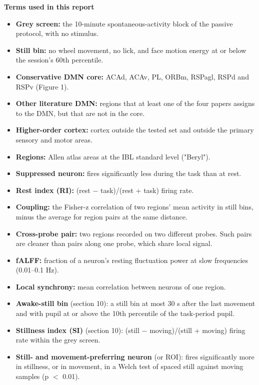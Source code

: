 \documentclass[10pt,a4paper]{article}
\begin{document}
\begin{tcolorbox}[breakable,colback=accent!8,colframe=accent,boxrule=0pt,leftrule=2pt,arc=0pt,fontupper=\small]
\textbf{Terms used in this report}

\begin{itemize}
\item \textbf{Grey screen:} the 10-minute spontaneous-activity block of the passive protocol, with no stimulus.
\item \textbf{Still bin:} no wheel movement, no lick, and face motion energy at or below the session's 60th percentile.
\item \textbf{Conservative DMN core:} ACAd, ACAv, PL, ORBm, RSPagl, RSPd and RSPv (Figure 1).
\item \textbf{Other literature DMN:} regions that at least one of the four papers assigns to the DMN, but that are not in the core.
\item \textbf{Higher-order cortex:} cortex outside the tested set and outside the primary sensory and motor areas.
\item \textbf{Regions:} Allen atlas areas at the IBL standard level ("Beryl").
\item \textbf{Suppressed neuron:} fires significantly less during the task than at rest.
\item \textbf{Rest index (RI):} (rest $-$ task)/(rest + task) firing rate.
\item \textbf{Coupling:} the Fisher-z correlation of two regions' mean activity in still bins, minus the average for region pairs at the same distance.
\item \textbf{Cross-probe pair:} two regions recorded on two different probes. Such pairs are cleaner than pairs along one probe, which share local signal.
\item \textbf{fALFF:} fraction of a neuron's resting fluctuation power at slow frequencies (0.01--0.1 Hz).
\item \textbf{Local synchrony:} mean correlation between neurons of one region.
\item \textbf{Awake-still bin} (section 10): a still bin at most 30 s after the last movement and with pupil at or above the 10th percentile of the task-period pupil.
\item \textbf{Stillness index (SI)} (section 10): (still $-$ moving)/(still + moving) firing rate within the grey screen.
\item \textbf{Still- and movement-preferring neuron} (or ROI): fires significantly more in stillness, or in movement, in a Welch test of spaced still against moving samples (p $<$ 0.01).

\end{itemize}
\end{tcolorbox}
\end{document}
